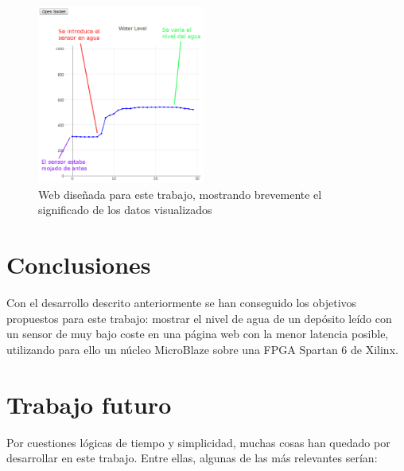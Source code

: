 \documentclass[conference,compsoc]{IEEEtran}
\begin{document}
		\begin{figure}[h!]
			\centering
			\includegraphics[width=0.49\textwidth]{./figuras/web_cliente.png}
			\caption{Web dise\~nada para este trabajo, mostrando brevemente el significado de los datos visualizados}
			\label{fig:web_cliente}
		\end{figure}



	\section{Conclusiones}

		Con el desarrollo descrito anteriormente se han conseguido los objetivos propuestos para
		este trabajo: mostrar el nivel de agua de un dep\'osito le\'ido con un sensor de muy bajo
		coste en una p\'agina web con la menor latencia posible, utilizando para ello un n\'ucleo
		MicroBlaze sobre una FPGA Spartan 6 de Xilinx.

	\section{Trabajo futuro}

		Por cuestiones l\'ogicas de tiempo y simplicidad, muchas cosas han quedado por desarrollar
		en este trabajo. Entre ellas, algunas de las m\'as relevantes ser\'ian:
\end{document}
